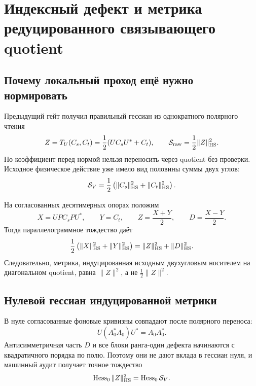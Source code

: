 \chapter{Индексный дефект и метрика редуцированного связывающего quotient}
\label{ch:v7-index-defect-reduced-linking-quotient-gate}

\section{Почему локальный проход ещё нужно нормировать}

Предыдущий гейт получил правильный гессиан из однократного полярного чтения
\begin{equation}
 Z=T_U(C_s,C_t)=\frac12(UC_sU^*+C_t),
 \qquad
 \mathcal S_{\rm raw}=\frac12\|Z\|_{\rm HS}^2.
 \label{eq:v7-reduced-raw-quotient-action}
\end{equation}
Но коэффициент перед нормой нельзя переносить через quotient без проверки.
Исходное физическое действие уже имело вид половины суммы двух углов:
\begin{equation}
 \mathcal S_V
 =\frac12\left(\|C_s\|_{\rm HS}^2+\|C_t\|_{\rm HS}^2\right).
 \label{eq:v7-reduced-original-two-corner-action}
\end{equation}

На согласованных десятимерных опорах положим
\begin{equation}
 X=UP C_sPU^*,
 \qquad Y=C_t,
 \qquad
 Z=\frac{X+Y}{2},
 \qquad D=\frac{X-Y}{2}.
 \label{eq:v7-reduced-symmetric-antisymmetric-curvature}
\end{equation}
Тогда параллелограммное тождество даёт
\begin{equation}
 \frac12\left(\|X\|_{\rm HS}^2+\|Y\|_{\rm HS}^2\right)
 =\|Z\|_{\rm HS}^2+\|D\|_{\rm HS}^2.
 \label{eq:v7-reduced-parallelogram-identity}
\end{equation}
Следовательно, метрика, индуцированная исходным двухугловым носителем на
диагональном quotient, равна $\|Z\|^2$, а не $\frac12\|Z\|^2$.

\section{Нулевой гессиан индуцированной метрики}

В нуле согласованные фоновые кривизны совпадают после полярного переноса:
\begin{equation}
 U(A_0^*A_0)U^*=A_0A_0^*.
 \label{eq:v7-reduced-background-intertwining}
\end{equation}
Антисимметричная часть $D$ и все блоки ранга-один дефекта начинаются с
квадратичного порядка по полю. Поэтому они не дают вклада в гессиан нуля,
и машинный аудит получает точное тождество
\begin{equation}
 \operatorname{Hess}_0\|Z\|_{\rm HS}^2
 =\operatorname{Hess}_0\mathcal S_V.
 \label{eq:v7-reduced-inherited-hessian-identity}
\end{equation}

